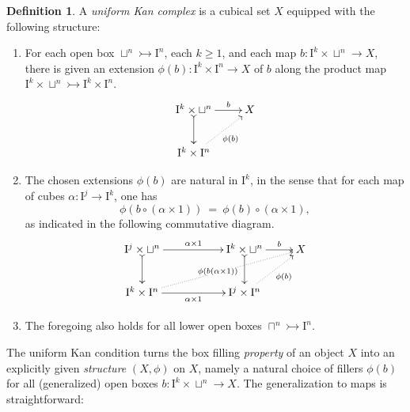 \documentclass[12pt]{article}
\newcommand{\mono}{\ensuremath{\rightarrowtail}}
\newcommand{\I}{\ensuremath{\mathrm{I}}}
\theoremstyle{remark}
\theoremstyle{definition}
\newtheorem{definition}[theorem]{Definition}
\begin{document}
\begin{definition}  A \emph{uniform Kan complex} is a cubical set $X$ equipped with the following structure:
\begin{enumerate}
\item  For each open box $\sqcup^n \mono \I^n$, each $k\geq 1$, and each map $b: \I^k \times\sqcup^n\to X$, there is given an extension $\phi(b) : \I^k\times\I^n \to X$ of $b$ along the product map $\I^k\times\sqcup^n \mono \I^k\times\I^n$.
\begin{equation}\label{diagram:uniformsimple}
\xymatrix{
\I^k\times \sqcup^n\ar@{>->}[d] \ar[r]^-{b}  & X\\
 \I^k \times \I^n \ar@{..>}[ru]_{\phi(b)} &
}
\end{equation}
\item The chosen extensions $\phi(b)$ are natural in $\I^k$, in the sense that for each map of cubes $\alpha : \I^j \to \I^k$, one has
\[
\phi(b\circ(\alpha\times 1))\ =\ \phi(b)\circ (\alpha\times 1),
\]
as indicated in the following commutative diagram.
\begin{equation}\label{diagram:uniformnatural}
\xymatrix{
\I^j\times \sqcup^n \ar@{>->}[d]  \ar[rr]^{\alpha\times 1} 
	&& \I^k\times \sqcup^n\ar@{>->}[d] \ar[r]^-{b} 
		& X\\
 \I^k \times \I^n \ar@{..>}[urrr]|{\phi(b(\alpha\times 1))\ \ } \ar[rr]_{\alpha\times 1} 
 	&&
	 \I^j \times \I^n  \ar@{..>}[ru]_-{\phi(b)} 
		&
}
\end{equation}
\item The foregoing also holds for all lower open boxes $\sqcap^n \mono \I^n$.
\end{enumerate}
\end{definition}

The uniform Kan condition turns the box filling \emph{property} of an object $X$ into an explicitly given \emph{structure} $(X, \phi)$ on $X$, namely a natural choice of fillers $\phi(b)$ for all (generalized) open boxes $b : \I^k\times \sqcup^n \to X$.  The generalization to maps is straightforward:
\end{document}
